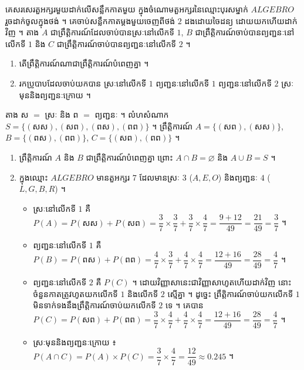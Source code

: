 \begin{example}[លំហាត់គំរូ ១]
គេសរសេរតួអក្សរមួយដាក់លើសន្លឹកកាតមួយ ក្នុងចំណោមតួអក្សរនៃឈ្មោះបុរសម្នាក់ $ALGEBRO$ រួចដាក់ចូលក្នុងថង់ ។ គេចាប់សន្លឹកកាតម្ដងមួយចេញពីថង់ $2$ ដងដោយចៃដន្យ ដោយយកហើយដាក់វិញ ។ តាង $A$ ជាព្រឹត្តិការណ៍ដែលចាប់បានស្រៈនៅលើកទី $1$, $B$ ជាព្រឹត្តិការណ៍ចាប់បានព្យញ្ជនៈនៅលើកទី $1$ និង $C$ ជាព្រឹត្តិការណ៍ចាប់បានព្យញ្ជនៈនៅលើកទី $2$ ។
\begin{enumerate}[a]
  \item តើព្រឹត្តិការណ៍ណាជាព្រឹត្តិការណ៍បំពេញគ្នា ។
  \item រកប្រូបាបដែលចាប់យកបាន ស្រៈនៅលើកទី $1$ ព្យញ្ជនៈនៅលើកទី $1$ ព្យញ្ជនៈនៅលើកទី $2$ ស្រៈមុននិងព្យញ្ជនៈក្រោយ ។
\end{enumerate}
\ans
តាង ស $=$ ស្រៈ និង ព $=$ ព្យញ្ជនៈ ។ លំហសំណាក $S = \{(\text{សស}), (\text{សព}), (\text{ពស}), (\text{ពព})\}$ ។ ព្រឹត្តិការណ៍ $A = \{(\text{សព}), (\text{សស})\}$, $B = \{(\text{ពស}), (\text{ពព})\}$, $C = \{(\text{សព}), (\text{ពព})\}$ ។
\begin{enumerate}[a]
  \item ព្រឹត្តិការណ៍ $A$ និង $B$ ជាព្រឹត្តិការណ៍បំពេញគ្នា ព្រោះ $A \cap B = \varnothing$ និង $A \cup B = S$ ។
  \item ក្នុងឈ្មោះ $ALGEBRO$ មានតួអក្សរ $7$ ដែលមានស្រៈ $3$ ($A, E, O$) និងព្យញ្ជនៈ $4$ ($L, G, B, R$) ។
  \begin{itemize}
    \item ស្រៈនៅលើកទី $1$ គឺ $P(A) = P(\text{សស}) + P(\text{សព}) = \dfrac{3}{7}\times\dfrac{3}{7} + \dfrac{3}{7}\times\dfrac{4}{7} = \dfrac{9 + 12}{49} = \dfrac{21}{49} = \dfrac{3}{7}$ ។
    \item ព្យញ្ជនៈនៅលើកទី $1$ គឺ $P(B) = P(\text{ពស}) + P(\text{ពព}) = \dfrac{4}{7}\times\dfrac{3}{7} + \dfrac{4}{7}\times\dfrac{4}{7} = \dfrac{12 + 16}{49} = \dfrac{28}{49} = \dfrac{4}{7}$ ។
    \item ព្យញ្ជនៈនៅលើកទី $2$ គឺ $P(C)$ ។ ដោយវិញ្ញាសានេះជាវិញ្ញាសាហូតហើយដាក់វិញ នោះចំនួនកាតត្រូវហូតយកលើកទី $1$ និងលើកទី $2$ ស្មើគ្នា ។ ដូច្នេះ ព្រឹត្តិការណ៍ចាប់យកលើកទី $1$ មិនទាក់ទងនឹងព្រឹត្តិការណ៍ចាប់យកលើកទី $2$ ទេ ។ គេបាន $P(C) = P(\text{សព}) + P(\text{ពព}) = \dfrac{3}{7}\times\dfrac{4}{7} + \dfrac{4}{7}\times\dfrac{4}{7} = \dfrac{12 + 16}{49} = \dfrac{28}{49} = \dfrac{4}{7}$ ។
    \item ស្រៈមុននិងព្យញ្ជនៈក្រោយ ៖ $P(A \cap C) = P(A)\times P(C) = \dfrac{3}{7}\times\dfrac{4}{7} = \dfrac{12}{49} \approx 0.245$ ។
  \end{itemize}
\end{enumerate}
\end{example}

